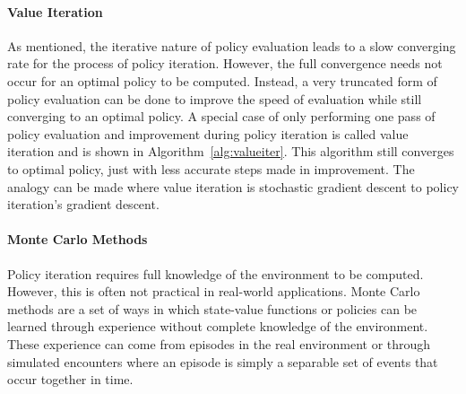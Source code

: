 

\paragraph*{Value Iteration}

As mentioned,
the iterative nature of policy evaluation leads to a slow converging rate
for the process of policy iteration.
%
However,
the full convergence needs not occur for an optimal policy to be computed.
%
Instead,
a very truncated form of policy evaluation can be done to improve the speed
of evaluation while still converging to an optimal policy.
%
A special case of only performing one pass of policy evaluation and improvement
during policy iteration is called value iteration
and is shown in Algorithm~\ref{alg:valueiter}. 
%
This algorithm still converges to optimal policy,
just with less accurate steps made in improvement.
%
The analogy can be made where value iteration is stochastic gradient descent
to policy iteration's gradient descent.



\paragraph*{Monte Carlo Methods}


Policy iteration requires full knowledge of the environment to be computed.
%
However,
this is often not practical in real-world applications.
%
Monte Carlo methods are a set of ways in which
state-value functions or policies can be learned through experience without
complete knowledge of the environment.
%
These experience can come from episodes in the real environment
or through simulated encounters
where an episode is simply a separable set of events that occur together in
time.

